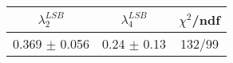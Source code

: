 \begin{tabular}{c|c||c}
$\lambda_{2}^{LSB}$ & $\lambda_4^{LSB}$ & $\chi^{2}$/ndf \\
\hline
0.369 $\pm$ 0.056 & 0.24 $\pm$ 0.13 & 132/99\\
\end{tabular}
